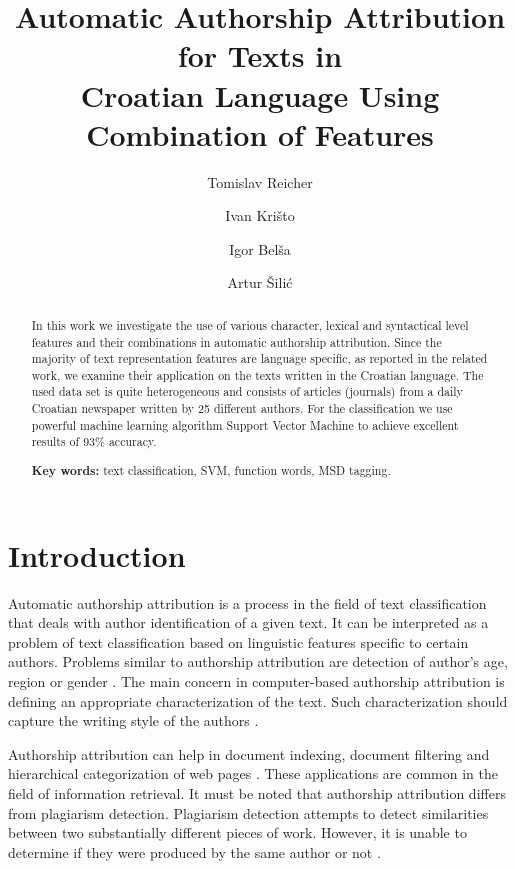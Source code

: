 \documentclass{llncs}
\begin{document}
\title{Automatic Authorship Attribution for Texts in\\Croatian Language Using
Combination of Features}
\author{Tomislav Reicher \and Ivan Krišto \and Igor Belša \and Artur Šilić}

\maketitle

\begin{abstract}
In this work we investigate the use of various character, lexical and syntactical
level features and their combinations in automatic authorship attribution. Since
the majority of text representation features are language
specific, as reported in the related work, we examine their application on the texts written in 
the Croatian language. The used data set is quite heterogeneous and consists of articles (journals)
from a daily Croatian newspaper written by 25 different authors.
For the classification we use powerful machine learning algorithm Support
Vector Machine to achieve excellent results of 93\% accuracy.

\vspace{10pt}
\textbf{Key words:} text classification, SVM, function words, MSD tagging.
\end{abstract}


\section{Introduction}
Automatic authorship attribution is a process in the field of text classification
that deals with author identification of a given text. It can
be interpreted as a problem of text classification based on linguistic features
specific to certain authors. Problems similar to authorship attribution are
detection of author's age, region or gender \cite{luyckx2005shallow}. The main
concern in computer-based authorship attribution is defining an appropriate
characterization of the text. Such characterization should capture the writing
style of the authors \cite{coyotl2006authorship}.

Authorship attribution can help in document indexing, document filtering and
hierarchical categorization of web pages \cite{luyckx2005shallow}. These
applications are common in the field of information retrieval. 
It must be noted that authorship attribution differs from plagiarism
detection. Plagiarism detection attempts to detect similarities between two substantially different pieces of
work. However, it is unable to determine if they were produced by the same author or not
\cite{de2001mining}.
\end{document}

